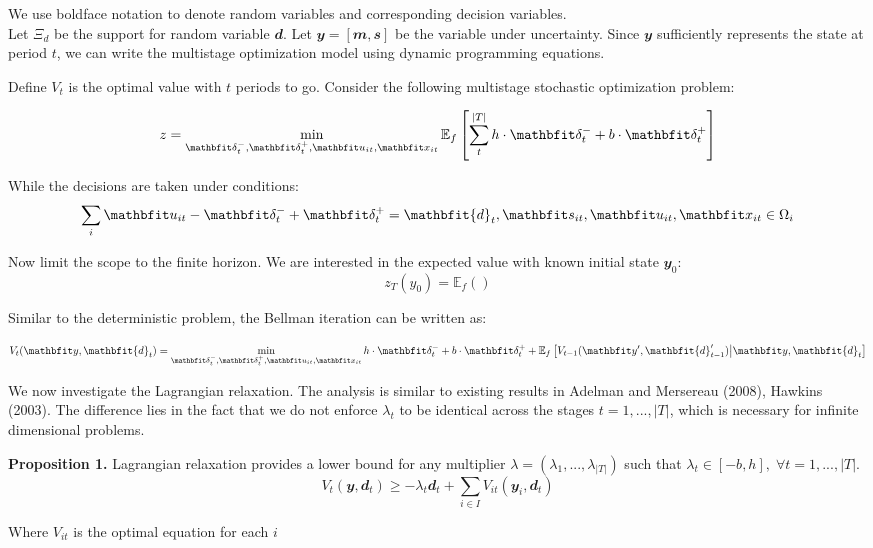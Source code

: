 \documentclass[
  a4paper,
,tablecaptionabove
]{scrartcl}
\numberwithin{equation}{section}
\begin{document}
We use boldface notation to denote random variables and corresponding
decision variables.\\
Let \(\Xi_d\) be the support for random variable \(\mathbfit{d}\). Let
\(\mathbfit y = \left[\mathbfit m,\mathbfit s \right]\) be the
variable under uncertainty. Since \(\mathbfit y\) sufficiently
represents the state at period \(t\), we can write the multistage
optimization model using dynamic programming equations.

Define \(V_{t}\) is the optimal value with \(t\) periods to go. Consider
the following multistage stochastic optimization problem:

\[z = \min_{\small{\mathbfit\delta^-_t, \mathbfit\delta^+_t, \mathbfit u_{it}, \mathbfit x_{it}}}
\mathbb{E}_f \left[ \sum_t^{|T|}h \cdot \mathbfit \delta^-_t + b \cdot \mathbfit \delta^+_t \right ]\]

While the decisions are taken under conditions:
\[\sum_i \mathbfit u_{it} - \mathbfit\delta^-_t + \mathbfit\delta^+_t = \mathbfit{d}_t, \quad \\
\mathbfit s_{it}, \mathbfit u_{it}, \mathbfit x_{it}\in \Omega_i\]

Now limit the scope to the finite horizon. We are interested in the
expected value with known initial state \(\mathbfit y_0\): \[
z_T(y_0) = \mathbb{E}_f ()
\]

Similar to the deterministic problem, the Bellman iteration can be
written as:

\[V_{t}(\mathbfit y, \mathbfit{d}_t) = 
\min_{\small{\mathbfit\delta^-_t, \mathbfit\delta^+_t, \mathbfit u_{it}, \mathbfit x_{it}}}  
h \cdot \mathbfit \delta^-_t + b \cdot \mathbfit \delta^+_t + \mathbb E_{f} \left [ V_{t-1}(\mathbfit y', \mathbfit{d}'_{t-1}) \big | \mathbfit y, \mathbfit{d}_t\right]\]

We now investigate the Lagrangian relaxation. The analysis is similar to
existing results in Adelman and Mersereau (2008), Hawkins (2003). The
difference lies in the fact that we do not enforce \(\lambda_t\) to be
identical across the stages \(t = 1, ..., |T|\), which is necessary for
infinite dimensional problems.

\textbf{Proposition 1.} Lagrangian relaxation provides a lower bound for
any multiplier \(\lambda = (\lambda_1, ..., \lambda_{|T|})\) such that
\(\lambda_t \in [-b, h],\; \forall t=1,..., |T|\).
\[V_{t}(\mathbfit y, \mathbfit d_t) \ge -\lambda_t \mathbfit d_t + \sum_{i\in I} V_{it}(\mathbfit y_i, \mathbfit d_t)\]

Where \(V_{it}\) is the optimal equation for each \(i\)
\end{document}

